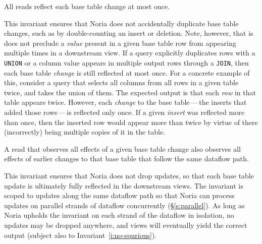 \begin{invariant}
  \label{i:no-spurious}
  All reads reflect each base table change at most once.
\end{invariant}

This invariant ensures that Noria does not accidentally duplicate base table
changes, such as by double-counting an insert or deletion. Note, however, that
is does not preclude a \emph{value} present in a given base table row from
appearing multiple times in a downstream view. If a query explicitly duplicates
rows with a \texttt{UNION} or a column value appears in multiple output rows
through a \texttt{JOIN}, then each base table \emph{change} is still reflected
at most once. For a concrete example of this, consider a query that selects all
columns from all rows in a given table twice, and takes the union of them. The
expected output is that each \emph{row} in that table appears twice. However,
each \emph{change} to the base table\,---\,the inserts that added those
rows\,---\,is reflected only once. If a given \emph{insert} was reflected more
than once, then the inserted row would appear more than twice by virtue of there
(incorrectly) being multiple copies of it in the table.

\begin{invariant}
  \label{i:no-holes}
  A read that observes all effects of a given base table change also observes
  all effects of earlier changes to that base table that follow the same
  dataflow path.
\end{invariant}

This invariant ensures that Noria does not drop updates, so that each base table
update is ultimately fully reflected in the downstream views. The invariant is
scoped to updates along the same dataflow path so that Noria can process updates
on parallel strands of dataflow concurrently (\S\ref{s:parallel}). As long as
Noria upholds the invariant on each strand of the dataflow in isolation, no
updates may be dropped anywhere, and views will eventually yield the correct
output (subject also to Invariant~\ref{i:no-spurious}).

